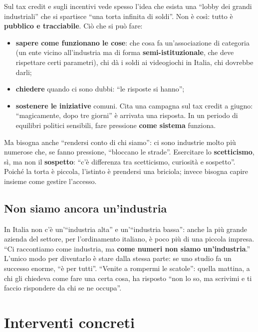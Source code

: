 Sul tax credit e sugli incentivi vede spesso l'idea che esista una ``lobby dei
grandi industriali'' che si spartisce ``una torta infinita di soldi''. Non è così:
tutto è \textbf{pubblico e tracciabile}. Ciò che si può fare:
\begin{itemize}
  \item \textbf{sapere come funzionano le cose}: che cosa fa un'associazione di
        categoria (un ente vicino all'industria ma di forma
        \textbf{semi-istituzionale}, che deve rispettare certi parametri), chi dà
        i soldi ai videogiochi in Italia, chi dovrebbe darli;
  \item \textbf{chiedere} quando ci sono dubbi: ``le risposte si hanno'';
  \item \textbf{sostenere le iniziative} comuni. Cita una campagna
        sul tax credit a giugno: ``magicamente, dopo tre giorni'' è arrivata una
        risposta. In un periodo di equilibri politici sensibili, fare pressione
        \textbf{come sistema} funziona.
\end{itemize}
Ma bisogna anche ``rendersi conto di chi siamo'': ci sono industrie molto più
numerose che, se fanno pressione, ``bloccano le strade''. Esercitare lo
\textbf{scetticismo}, sì, ma non il \textbf{sospetto}: ``c'è differenza tra
scetticismo, curiosità e sospetto''. Poiché la torta è piccola, l'istinto è
prendersi una briciola; invece bisogna capire insieme come gestire l'accesso.

\subsection{Non siamo ancora un'industria}

In Italia non c'è un'``industria alta'' e un'``industria bassa'': anche la più
grande azienda del settore, per l'ordinamento italiano, è poco più di una piccola
impresa. ``Ci raccontiamo come industria, ma \textbf{come numeri non siamo
un'industria}.'' L'unico modo per diventarlo è stare dalla stessa parte: se uno
studio fa un successo enorme, ``è per tutti''. ``Venite a rompermi le scatole'':
quella mattina, a chi gli chiedeva come fare una certa cosa, ha risposto ``non lo
so, ma scrivimi e ti faccio rispondere da chi se ne occupa''.

\section{Interventi concreti}
\label{sec:c2-3-interventi}

